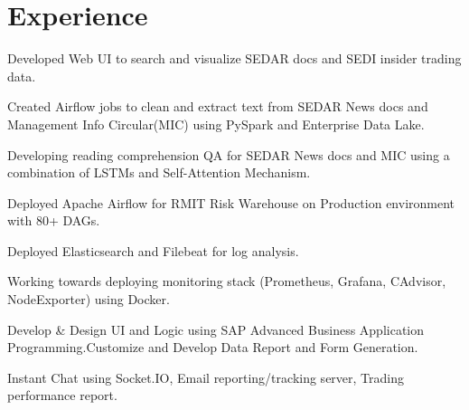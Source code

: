 \documentclass[]{Vishnu-Resume}
\begin{document}
\hfill
\begin{minipage}[t]{0.66\textwidth} 


\section{Experience}

\vspace{\topsep} %
\begin{tightemize}
\item Developed Web UI to search and visualize SEDAR docs and SEDI insider trading data.
\item Created Airflow jobs to clean and extract text from SEDAR News docs and Management Info Circular(MIC) using PySpark and Enterprise Data Lake. 
\item Developing reading comprehension QA for SEDAR News docs and MIC using a combination of LSTMs and Self-Attention Mechanism.
\end{tightemize}
\sectionsep

\begin{tightemize}\item Deployed Apache Airflow for RMIT Risk Warehouse on Production environment with 80+ DAGs.
\item Deployed Elasticsearch and Filebeat for log analysis.
\item Working towards deploying monitoring stack (Prometheus, Grafana, CAdvisor, NodeExporter) using Docker.
\end{tightemize}
\sectionsep

\begin{tightemize}\item Develop \& Design UI and Logic using SAP Advanced Business Application
Programming.Customize and Develop Data Report and Form Generation.
\end{tightemize}
\sectionsep

\begin{tightemize}\item Instant Chat using Socket.IO, Email reporting/tracking server, Trading performance report.
\end{tightemize}
\sectionsep


\end{minipage}
\end{document}
